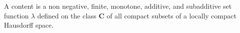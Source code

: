 A content is a non negative, finite, monotone, additive, and subadditive set function $\lambda$ defined on the class $\mathbf{C}$ of all compact subsets of a locally compact Hausdorff space.
